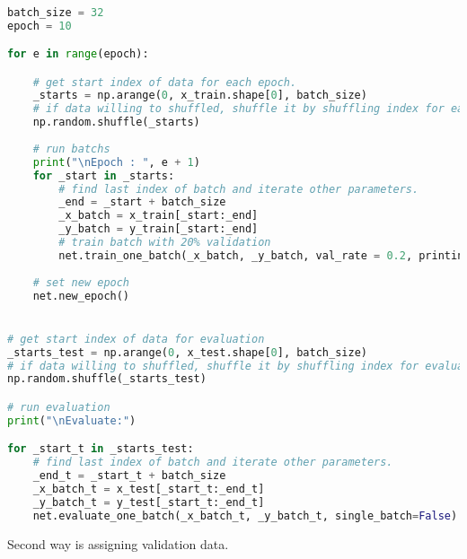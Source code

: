 \documentclass[12pt]{report}
\begin{document}
\begin{lstlisting}[language=Python, numbers=none, caption={Train and evaluate batch with validation rate.}, label={ex:train-batch-val-rate}]

batch_size = 32
epoch = 10

for e in range(epoch):

	# get start index of data for each epoch.
	_starts = np.arange(0, x_train.shape[0], batch_size)
	# if data willing to shuffled, shuffle it by shuffling index for each epoch.
	np.random.shuffle(_starts)
	
	# run batchs 
	print("\nEpoch : ", e + 1)
	for _start in _starts:
		# find last index of batch and iterate other parameters.
		_end = _start + batch_size                
		_x_batch = x_train[_start:_end]
		_y_batch = y_train[_start:_end]
		# train batch with 20% validation
		net.train_one_batch(_x_batch, _y_batch, val_rate = 0.2, printing=['loss', 'accuracy', 'val_loss', 'val_acc'], single_batch=False)
	
	# set new epoch 
	net.new_epoch()


# get start index of data for evaluation
_starts_test = np.arange(0, x_test.shape[0], batch_size)
# if data willing to shuffled, shuffle it by shuffling index for evaluation
np.random.shuffle(_starts_test)

# run evaluation
print("\nEvaluate:")

for _start_t in _starts_test:
	# find last index of batch and iterate other parameters.
	_end_t = _start_t + batch_size                
	_x_batch_t = x_test[_start_t:_end_t]
	_y_batch_t = y_test[_start_t:_end_t]
	net.evaluate_one_batch(_x_batch_t, _y_batch_t, single_batch=False)

\end{lstlisting}

Second way is assigning validation data. 
\end{document}
